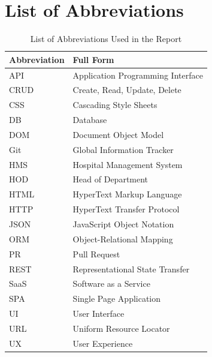 \documentclass[12pt,a4paper]{article}
\begin{document}
\newpage
\section*{List of Abbreviations}

\begin{table}[h!]
\centering
\begin{tabular}{|p{3cm}|p{10cm}|}
\hline
\textbf{Abbreviation} & \textbf{Full Form} \\
\hline
API & Application Programming Interface \\
\hline
CRUD & Create, Read, Update, Delete \\
\hline
CSS & Cascading Style Sheets \\
\hline
DB & Database \\
\hline
DOM & Document Object Model \\
\hline
Git & Global Information Tracker \\
\hline
HMS & Hospital Management System \\
\hline
HOD & Head of Department \\
\hline
HTML & HyperText Markup Language \\
\hline
HTTP & HyperText Transfer Protocol \\
\hline
JSON & JavaScript Object Notation \\
\hline
ORM & Object-Relational Mapping \\
\hline
PR & Pull Request \\
\hline
REST & Representational State Transfer \\
\hline
SaaS & Software as a Service \\
\hline
SPA & Single Page Application \\
\hline
UI & User Interface \\
\hline
URL & Uniform Resource Locator \\
\hline
UX & User Experience \\
\hline
\end{tabular}
\caption{List of Abbreviations Used in the Report}
\label{tab:abbreviations}
\end{table}
\end{document}
